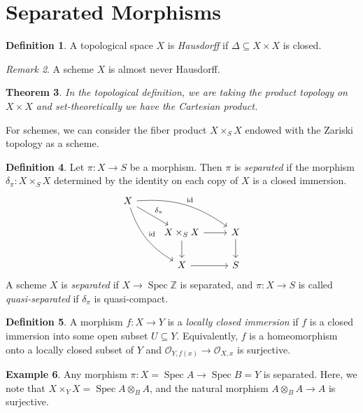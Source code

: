 \documentclass[leqno, openany]{memoir}
\newtheorem{thm}{Theorem}[section]
\theoremstyle{definition}
\newtheorem{defn}[thm]{Definition}
\newtheorem{exm}[thm]{Example}
\theoremstyle{remark}
\newtheorem{rmk}[thm]{Remark}
\theoremstyle{plain}
\theoremstyle{definition}
\theoremstyle{remark}
\newcommand{\Z}{\mathbb{Z}}
\newcommand{\mc}[1]{\mathcal{#1}}
\newcommand{\mr}[1]{\mathrm{#1}}
\DeclareMathOperator{\Spec}{Spec}
\begin{document}
\section{Separated Morphisms}%

\begin{defn} A topological space $X$ is \textit{Hausdorff} if $\Delta \subseteq
X \times X$ is closed.  \end{defn}

\begin{rmk} A scheme $X$ is almost never Hausdorff.  \end{rmk}

\begin{thm} In the topological definition, we are taking the product topology
on $X \times X$ and set-theoretically we have the Cartesian product.  \end{thm}

For schemes, we can consider the fiber product $X \times_S X$ endowed with the
Zariski topology as a scheme.  \begin{defn} Let $\pi \colon X \to S$ be a
    morphism. Then $\pi$ is \textit{separated} if the morphism $\delta_{\pi}
    \colon X \times_S X$ determined by the identity on each copy of $X$ is a
    closed immersion.  \begin{equation*} \begin{tikzcd} X \ar[bend
    left=20]{drr}{\mr{id}} \ar[bend right=20]{ddr}{\mr{id}}
\ar{dr}{\delta_{\pi}} \\ & X \times_S X \ar{r} \ar{d} & X \ar{d} \\ & X \ar{r}
                         & S \end{tikzcd} \end{equation*} A scheme $X$ is
                         \textit{separated} if $X \to \Spec \Z$ is separated,
                         and $\pi \colon X \to S$ is called
                         \textit{quasi-separated} if $\delta_{\pi}$ is
                         quasi-compact.  \end{defn}

\begin{defn} A morphism $f \colon X \to Y$ is a \textit{locally closed
    immersion} if $f$ is a closed immersion into some open subset $U \subseteq
    Y$. Equivalently, $f$ is a homeomorphism onto a locally closed subset of
    $Y$ and $\mc{O}_{Y, f(x)} \to \mc{O}_{X,x}$ is surjective.  \end{defn}

\begin{exm} Any morphism $\pi \colon X = \Spec A \to \Spec B = Y$ is separated.
Here, we note that $X \times_Y X = \Spec A \otimes_B A$, and the natural
morphism $A \otimes_B A \to A$ is surjective.  \end{exm}
\end{document}
